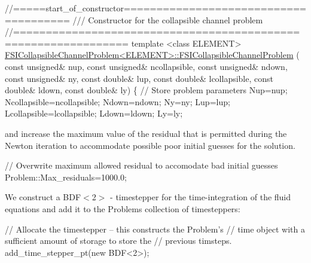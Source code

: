  
\begin{DoxyCodeInclude}
\textcolor{comment}{//=====start\_of\_constructor======================================}
\textcolor{comment}{/// Constructor for the collapsible channel problem}
\textcolor{comment}{}\textcolor{comment}{//===============================================================}
\textcolor{keyword}{template} <\textcolor{keyword}{class} ELEMENT>
\hyperlink{classFSICollapsibleChannelProblem_afe14ae0d2bdfc9a15969c9bdcd6e2512}{FSICollapsibleChannelProblem<ELEMENT>::FSICollapsibleChannelProblem}
      (
 \textcolor{keyword}{const} \textcolor{keywordtype}{unsigned}& nup, 
 \textcolor{keyword}{const} \textcolor{keywordtype}{unsigned}& ncollapsible,
 \textcolor{keyword}{const} \textcolor{keywordtype}{unsigned}& ndown,
 \textcolor{keyword}{const} \textcolor{keywordtype}{unsigned}& ny,
 \textcolor{keyword}{const} \textcolor{keywordtype}{double}& lup,
 \textcolor{keyword}{const} \textcolor{keywordtype}{double}& lcollapsible, 
 \textcolor{keyword}{const} \textcolor{keywordtype}{double}& ldown,
 \textcolor{keyword}{const} \textcolor{keywordtype}{double}& ly)
\{
 \textcolor{comment}{// Store problem parameters}
 Nup=nup;
 Ncollapsible=ncollapsible;
 Ndown=ndown;
 Ny=ny;
 Lup=lup;
 Lcollapsible=lcollapsible;
 Ldown=ldown;
 Ly=ly;

\end{DoxyCodeInclude}


and increase the maximum value of the residual that is permitted during the Newton iteration to accommodate possible poor initial guesses for the solution. 
\begin{DoxyCodeInclude}


 \textcolor{comment}{// Overwrite maximum allowed residual to accomodate bad initial guesses}
 Problem::Max\_residuals=1000.0;

\end{DoxyCodeInclude}


We construct a {\ttfamily B\+D\+F$<$2$>$} -\/ timestepper for the time-\/integration of the fluid equations and add it to the Problem\textquotesingle{}s collection of timesteppers\+:


\begin{DoxyCodeInclude}

 \textcolor{comment}{// Allocate the timestepper -- this constructs the Problem's }
 \textcolor{comment}{// time object with a sufficient amount of storage to store the}
 \textcolor{comment}{// previous timsteps. }
 add\_time\_stepper\_pt(\textcolor{keyword}{new} BDF<2>);

\end{DoxyCodeInclude}


